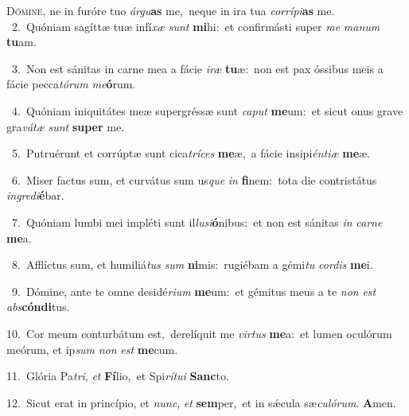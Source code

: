 \lettrine{\initial\textcolor{\initialcolor}{D}}{ómine,} ne in furóre tuo \textit{ár}\-\textit{gu}\textbf{as} me,~\star neque in ira tua \textit{cor}\-\textit{rí}\textit{pi}\textbf{as} me.\\
{\numbfont\textcolor{\numbcolor}{~2.}}~Quóniam sagíttæ tuæ infí\textit{xæ} \textit{sunt} \textbf{mi}\-hi:~\star et confirmásti super \textit{me} \textit{ma}\-\textit{num} \textbf{tu}\-am.\par
{\numbfont\textcolor{\numbcolor}{~3.}}~Non est sánitas in carne mea a fácie \textit{i}\-\textit{ræ} \textbf{tu}\-æ:~\star non est pax óssibus meis a fácie pecca\-\textit{tó}\-\textit{rum} \textit{me}\-\textbf{ó}rum.\par
{\numbfont\textcolor{\numbcolor}{~4.}}~Quóniam iniquitátes meæ supergréssæ sunt \textit{ca}\-\textit{put} \textbf{me}\-um:~\star et sicut onus grave gra\-\textit{vá}\-\textit{tæ} \textit{sunt} \textbf{su}\-\textbf{per} me.\par
{\numbfont\textcolor{\numbcolor}{~5.}}~Putruérunt et corrúptæ sunt cica\-\textit{trí}\-\textit{ces} \textbf{me}\-æ,~\star a fácie insipi\-\textit{én}\-\textit{ti}\textit{æ} \textbf{me}\-æ.\par
{\numbfont\textcolor{\numbcolor}{~6.}}~Miser factus sum, et curvátus sum us\textit{que} \textit{in} \textbf{fi}\-nem:~\star tota die contristátus \textit{in}\-\textit{gre}\textit{di}\textbf{é}bar.\par
{\numbfont\textcolor{\numbcolor}{~7.}}~Quóniam lumbi mei impléti sunt il\-\textit{lu}\-\textit{si}\textbf{ó}nibus:~\star et non est sánitas \textit{in} \textit{car}\-\textit{ne} \textbf{me}\-a.\par
{\numbfont\textcolor{\numbcolor}{~8.}}~Afflíctus sum, et humiliá\textit{tus} \textit{sum} \textbf{ni}\-mis:~\star rugiébam a gémi\textit{tu} \textit{cor}\-\textit{dis} \textbf{me}\-i.\par
{\numbfont\textcolor{\numbcolor}{~9.}}~Dómine, ante te omne desidé\-\textit{ri}\-\textit{um} \textbf{me}\-um:~\star et gémitus meus a te \textit{non} \textit{est} \textit{abs}\-\textbf{cón}\textbf{di}tus.\par
{\numbfont\textcolor{\numbcolor}{10.}}~Cor meum conturbátum est,~\dagger derelíquit me \textit{vir}\-\textit{tus} \textbf{me}\-a:~\star et lumen oculórum meórum, et ip\textit{sum} \textit{non} \textit{est} \textbf{me}\-cum.\par
{\numbfont\textcolor{\numbcolor}{11.}}~Glória Pa\-\textit{tri}\-, \textit{et} \textbf{Fí}\-lio,~\star et Spi\-\textit{rí}\-\textit{tu}\textit{i} \textbf{Sanc}\-to.\par
{\numbfont\textcolor{\numbcolor}{12.}}~Sicut erat in princípio, et \textit{nunc}\-, \textit{et} \textbf{sem}\-per,~\star et in sǽcula sæ\-\textit{cu}\-\textit{ló}\textit{rum}. \textbf{A}\-men.\par
